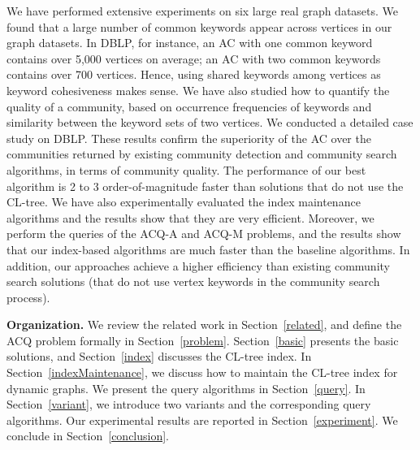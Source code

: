 We have performed extensive experiments on six large real graph datasets.
We found that a large number of common keywords appear across vertices in our graph datasets. In DBLP, for instance, an AC with one common keyword contains over 5,000 vertices on average; an AC with two common keywords contains over 700 vertices. Hence, using shared keywords among vertices as keyword cohesiveness makes sense.
We have also studied how to quantify the quality of a community, based on occurrence frequencies of keywords and similarity between the keyword sets of two vertices. We conducted a detailed case study on DBLP. These results confirm the superiority of the AC over the communities returned by existing community detection and community search algorithms, in terms of community quality. The performance of our best algorithm is 2 to 3 order-of-magnitude faster than solutions that do not use the CL-tree.
We have also experimentally evaluated the index maintenance algorithms and the results show that they are very efficient.
Moreover, we perform the queries of the ACQ-A and ACQ-M problems, and the results show that our index-based algorithms are much faster than the baseline algorithms. In addition, our approaches achieve a higher efficiency than existing community search solutions (that do not use vertex keywords in the community search process).

{\bf Organization.} We review the related work in Section~\ref{related}, and define the ACQ problem formally in Section~\ref{problem}. Section~\ref{basic} presents the basic solutions, and Section~\ref{index} discusses the CL-tree index.
In Section~\ref{indexMaintenance}, we discuss how to maintain the CL-tree index for dynamic graphs.
We present the query algorithms in Section~\ref{query}.
In Section~\ref{variant}, we introduce two variants and the corresponding query algorithms.
Our experimental results are reported in Section~\ref{experiment}.
We conclude in Section~\ref{conclusion}. 